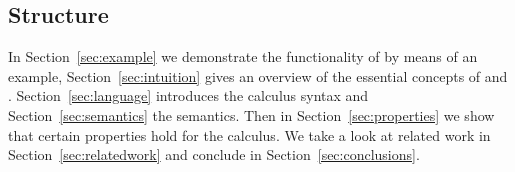 \subsection{Structure}

In Section~\ref{sec:example} we demonstrate the functionality of \TOPHAT by means of an example,
Section~\ref{sec:intuition} gives an overview of the essential concepts of \TOP and \TOPHAT.
Section~\ref{sec:language} introduces the \TOPHAT calculus syntax
and Section~\ref{sec:semantics} the semantics.
Then in Section~\ref{sec:properties} we show that certain properties hold for the calculus.
We take a look at related work in Section~\ref{sec:relatedwork}
and conclude in Section~\ref{sec:conclusions}.
